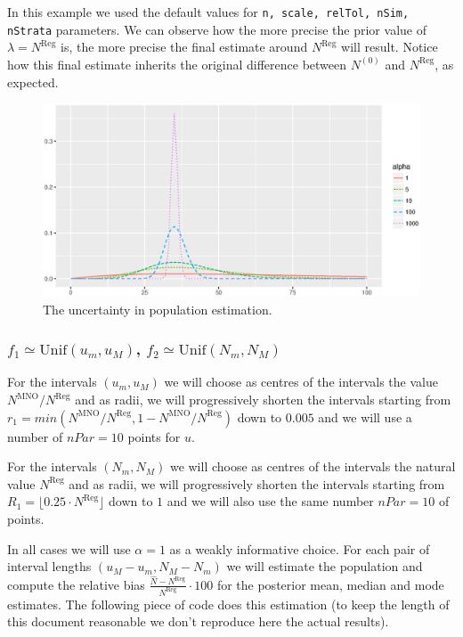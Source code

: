 \documentclass[12pt, a4paper]{article}
\begin{document}
In this example we used the default values for \texttt{n, scale, relTol, nSim, nStrata} parameters.
We can observe how the more precise the prior value of $\lambda = N^{\textrm{Reg}}$ is, the more precise 
the final estimate around $N^{\textrm{Reg}}$ will result. 
Notice how this final estimate inherits the original difference between $N^{(0)}$ and $N^{\textrm{Reg}}$, as expected.

\begin{figure}
	\centering
	\includegraphics[scale=0.75]{gamma.eps}
	\caption{The uncertainty in population estimation.}
	\label{one}
\end{figure}

\subsubsection{$f_{1}\simeq\textrm{Unif}(u_{m}, u_{M})$, $f_{2}\simeq\textrm{Unif}(N_{m}, N_{M})$}

For the intervals $(u_{m}, u_{M})$ we will choose as centres of the intervals the value $N^{\textrm{MNO}} / N^{\textrm{Reg}}$ and as radii, 
we will progressively shorten the intervals starting from 
$r_{1}=min(N^{\textrm{MNO}} / N^{\textrm{Reg}}, 1- N^{\textrm{MNO}} / N^{\textrm{Reg}})$ down to $0.005$ and we will
use a number of $nPar=10$ points for $u$.

For the intervals $(N_{m}, N_{M})$ we will choose as centres of the intervals the 
natural value $N^{\textrm{Reg}}$ and as radii, we will progressively shorten the intervals starting from 
$R_{1}=\lfloor 0.25\cdot N^{\textrm{Reg}}\rfloor$ down to $1$ and we will also use the same number $nPar=10$ of points.

In all cases we will use $\alpha = 1$ as a weakly informative choice. For each pair of 
interval lengths $(u_{M}-u_{m}, N_{M} - N_{m})$ we will estimate the population and compute the relative
bias $\frac{\hat{N}-N^{\textrm{Reg}}}{N^{\textrm{Reg}}} \cdot 100$ for 
the posterior mean, median and mode estimates. The following piece of code does this estimation (to keep
the length of this document reasonable we don't reproduce here the actual results).
\end{document}
